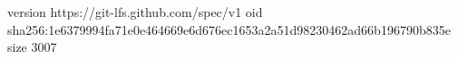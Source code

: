 version https://git-lfs.github.com/spec/v1
oid sha256:1e6379994fa71e0e464669e6d676ec1653a2a51d98230462ad66b196790b835e
size 3007

